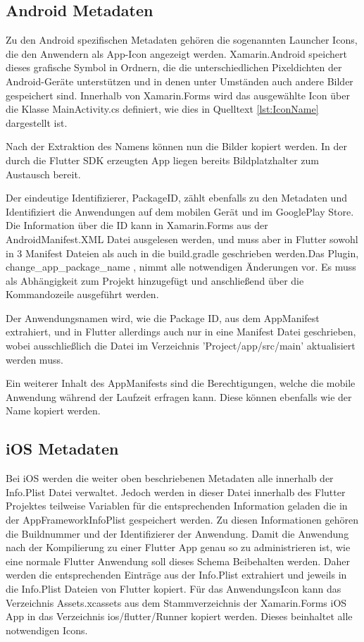 \subsection{Android Metadaten}
Zu den Android spezifischen Metadaten gehören die sogenannten Launcher Icons, die den Anwendern als App-Icon angezeigt werden. Xamarin.Android speichert dieses grafische Symbol in Ordnern, die die unterschiedlichen Pixeldichten der Android-Geräte unterstützen und in denen unter Umständen auch andere Bilder gespeichert sind.  Innerhalb von Xamarin.Forms wird das ausgewählte Icon über die Klasse MainActivity.cs definiert, wie dies in Quelltext \ref{lst:IconName} dargestellt ist. 



Nach der Extraktion des Namens können nun die Bilder kopiert werden.  In der durch die Flutter SDK erzeugten App liegen bereits Bildplatzhalter zum Austausch bereit.

Der eindeutige Identifizierer, PackageID,  zählt ebenfalls zu den Metadaten und Identifiziert die  Anwendungen auf dem mobilen Gerät und im GooglePlay Store.  Die Information über die ID kann in Xamarin.Forms aus der AndroidManifest.XML Datei ausgelesen  werden, und muss aber in Flutter sowohl in 3 Manifest Dateien als auch in die build.gradle geschrieben werden.Das Plugin,  change\_app\_package\_name , nimmt alle notwendigen Änderungen vor. Es muss als Abhängigkeit zum Projekt hinzugefügt und anschließend über die Kommandozeile ausgeführt werden. 


Der Anwendungsnamen wird, wie die Package ID, aus dem AppManifest extrahiert, und in Flutter allerdings auch nur in eine Manifest Datei geschrieben, wobei ausschließlich die Datei im 
Verzeichnis ’Project/app/src/main’ aktualisiert werden muss.

Ein weiterer Inhalt des AppManifests sind die Berechtigungen, welche die mobile Anwendung während der Laufzeit erfragen kann. Diese können ebenfalls wie der Name
kopiert werden. 

\subsection{iOS Metadaten}
Bei iOS werden die weiter oben beschriebenen Metadaten alle innerhalb der Info.Plist Datei verwaltet.  Jedoch werden in dieser Datei innerhalb des Flutter Projektes teilweise Variablen für die entsprechenden Information geladen die in der AppFrameworkInfoPlist gespeichert werden.  Zu diesen Informationen gehören die Buildnummer und der Identifizierer der Anwendung.  Damit die Anwendung nach der Kompilierung zu einer Flutter App genau so zu administrieren ist, wie eine normale Flutter Anwendung soll dieses Schema Beibehalten werden.  Daher werden die entsprechenden Einträge aus der Info.Plist extrahiert und jeweils in die Info.Plist Dateien von Flutter kopiert. 
Für das AnwendungsIcon kann das Verzeichnis Assets.xcassets aus dem Stammverzeichnis der Xamarin.Forms iOS App in das Verzeichnis ios/flutter/Runner kopiert werden.  Dieses beinhaltet alle notwendigen Icons.


